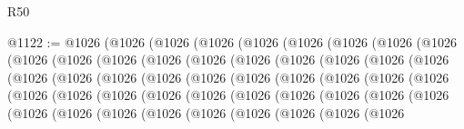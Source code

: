 \begin{lexlean}{R50}
\begin{coremodule}
{{{{{{{{{{{{{{{{{{{{{{{{{{{{{{{{{{{{{{{{{{{{{{{{{{{{{{{{{{{{@1122 := @1026
    (@1026
      (@1026
        (@1026
          (@1026
            (@1026
              (@1026
                (@1026
                  (@1026
                    (@1026
                      (@1026
                        (@1026
                          (@1026
                            (@1026
                              (@1026
                                (@1026
                                  (@1026
                                    (@1026
                                      (@1026
                                        (@1026
                                          (@1026
                                            (@1026
                                              (@1026
                                                (@1026
                                                  (@1026
                                                    (@1026
                                                      (@1026
                                                        (@1026
                                                          (@1026
                                                            (@1026
                                                              (@1026
                                                                (@1026
                                                                  (@1026
                                                                    (@1026
                                                                      (@1026
                                                                        (@1026
                                                                          (@1026
                                                                            (@1026
                                                                              (@1026
                                                                                (@1026
                                                                                  (@1026
                                                                                    (@1026
                                                                                      (@1026
                                                                                        (@1026
                                                                                          (@1026
                                                                                            (@1026
                                                                                              (@1026
                                                                                                (@1026
}}}}}}}}}}}}}}}}}}}}}}}}}}}}}}}}}}}}}}}}}}}}}}}}}}}}}}}}}}}}
\end{coremodule}
\end{lexlean}
